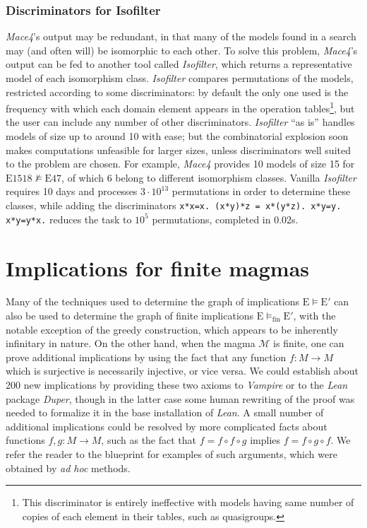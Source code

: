\documentclass[12pt]{amsart}
\theoremstyle{definition}
\newcommand{\modelsfin}{\models_{\mathrm{fin}}}
\newcommand{\Magma}{{\mathcal{M}}}
\newcommand{\Eq}[1]{\mathrm{E}#1}
\newcommand{\E}{\mathrm{E}}
\begin{document}
\subsubsection{Discriminators for Isofilter}
\emph{Mace4}'s output may be redundant, in that many of the models found in a search may (and often will) be isomorphic to each other. To solve this problem, \emph{Mace4}'s output can be fed to another tool called \emph{Isofilter}, which returns a representative model of each isomorphism class. \emph{Isofilter} compares permutations of the models, restricted according to some discriminators: by default the only one used is the frequency with which each domain element appears in the operation tables\footnote{This discriminator is entirely ineffective with models having same number of copies of each element in their tables, such as quasigroups.}, but the user can include any number of other discriminators. \emph{Isofilter} ``as is'' handles models of size up to around 10 with ease; but the combinatorial explosion soon makes computations unfeasible for larger sizes, unless discriminators well suited to the problem are chosen. For example, \emph{Mace4} provides 10 models of size 15 for $\Eq{1518} \not\models \Eq{47}$, of which $6$ belong to different isomorphism classes. Vanilla \emph{Isofilter} requires 10 days and processes $3\cdot10^{13}$ permutations in order to determine these classes, while adding the discriminators \verb|x*x=x. (x*y)*z = x*(y*z). x*y=y. x*y=y*x.| reduces the task to $10^5$ permutations, completed in 0.02s.

\section{Implications for finite magmas}\label{austin-sec}

Many of the techniques used to determine the graph of implications $\E \models \E'$ can also be used to determine the graph of finite implications $\E \modelsfin \E'$, with the notable exception of the greedy construction, which appears to be inherently infinitary in nature.  On the other hand, when the magma $\Magma$ is finite, one can prove additional implications by using the fact that any function $f \colon M \to M$ which is surjective is necessarily injective, or vice versa.  We could establish about 200 new implications by providing these two axioms to \emph{Vampire} or to the \emph{Lean} package \emph{Duper}, though in the latter case some human rewriting of the proof was needed to formalize it in the base installation of \emph{Lean}.  A small number of additional implications could be resolved by more complicated facts about functions $f,g \colon M \to M$, such as the fact that $f = f \circ f \circ g$ implies $f = f \circ g \circ f$.  We refer the reader to the blueprint for examples of such arguments, which were obtained by \emph{ad hoc} methods.
\end{document}
